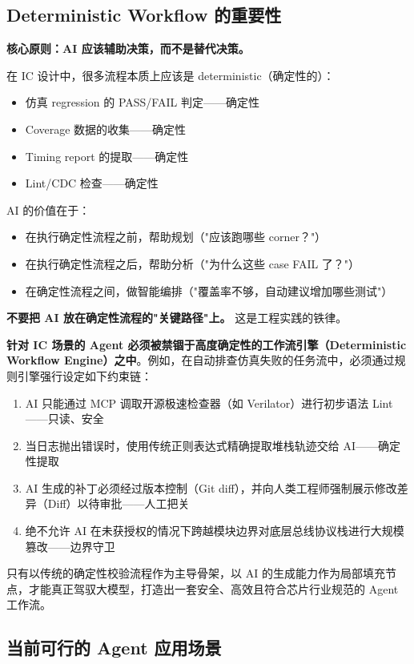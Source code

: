 \documentclass[UTF8,a4paper,10pt,oneside]{ctexart}
\begin{document}
\subsection{Deterministic Workflow 的重要性}

\textbf{核心原则：AI 应该辅助决策，而不是替代决策。}

在 IC 设计中，很多流程本质上应该是 deterministic（确定性的）：
\begin{itemize}
    \item 仿真 regression 的 PASS/FAIL 判定——确定性
    \item Coverage 数据的收集——确定性
    \item Timing report 的提取——确定性
    \item Lint/CDC 检查——确定性
\end{itemize}

AI 的价值在于：
\begin{itemize}
    \item 在执行确定性流程之前，帮助规划（"应该跑哪些 corner？"）
    \item 在执行确定性流程之后，帮助分析（"为什么这些 case FAIL 了？"）
    \item 在确定性流程之间，做智能编排（"覆盖率不够，自动建议增加哪些测试"）
\end{itemize}

\textbf{不要把 AI 放在确定性流程的"关键路径"上。} 这是工程实践的铁律。

\textbf{针对 IC 场景的 Agent 必须被禁锢于高度确定性的工作流引擎（Deterministic Workflow Engine）之中}。例如，在自动排查仿真失败的任务流中，必须通过规则引擎强行设定如下约束链：
\begin{enumerate}
    \item AI 只能通过 MCP 调取开源极速检查器（如 Verilator）进行初步语法 Lint——只读、安全
    \item 当日志抛出错误时，使用传统正则表达式精确提取堆栈轨迹交给 AI——确定性提取
    \item AI 生成的补丁必须经过版本控制（Git diff），并向人类工程师强制展示修改差异（Diff）以待审批——人工把关
    \item 绝不允许 AI 在未获授权的情况下跨越模块边界对底层总线协议栈进行大规模篡改——边界守卫
\end{enumerate}

只有以传统的确定性校验流程作为主导骨架，以 AI 的生成能力作为局部填充节点，才能真正驾驭大模型，打造出一套安全、高效且符合芯片行业规范的 Agent 工作流。

\subsection{当前可行的 Agent 应用场景}
\end{document}
